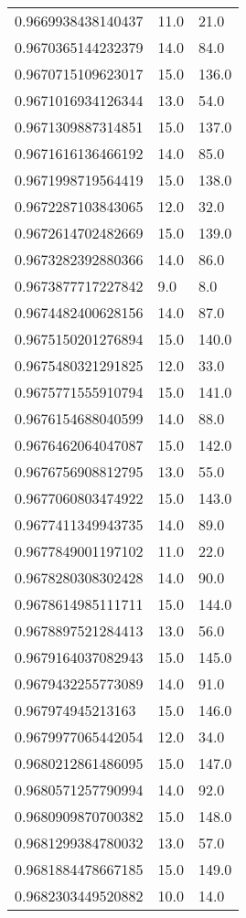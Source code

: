 \begin{center}
\begin{supertabular}[H]{p{0.30\textwidth}p{0.05\textwidth}p{0.05\textwidth}}
0.9669938438140437 & 11.0 & 21.0 \\ 
0.9670365144232379 & 14.0 & 84.0 \\ 
0.9670715109623017 & 15.0 & 136.0 \\ 
0.9671016934126344 & 13.0 & 54.0 \\ 
0.9671309887314851 & 15.0 & 137.0 \\ 
0.9671616136466192 & 14.0 & 85.0 \\ 
0.9671998719564419 & 15.0 & 138.0 \\ 
0.9672287103843065 & 12.0 & 32.0 \\ 
0.9672614702482669 & 15.0 & 139.0 \\ 
0.9673282392880366 & 14.0 & 86.0 \\ 
0.9673877717227842 & 9.0 & 8.0 \\ 
0.9674482400628156 & 14.0 & 87.0 \\ 
0.9675150201276894 & 15.0 & 140.0 \\ 
0.9675480321291825 & 12.0 & 33.0 \\ 
0.9675771555910794 & 15.0 & 141.0 \\ 
0.9676154688040599 & 14.0 & 88.0 \\ 
0.9676462064047087 & 15.0 & 142.0 \\ 
0.9676756908812795 & 13.0 & 55.0 \\ 
0.9677060803474922 & 15.0 & 143.0 \\ 
0.9677411349943735 & 14.0 & 89.0 \\ 
0.9677849001197102 & 11.0 & 22.0 \\ 
0.9678280308302428 & 14.0 & 90.0 \\ 
0.9678614985111711 & 15.0 & 144.0 \\ 
0.9678897521284413 & 13.0 & 56.0 \\ 
0.9679164037082943 & 15.0 & 145.0 \\ 
0.9679432255773089 & 14.0 & 91.0 \\ 
0.967974945213163 & 15.0 & 146.0 \\ 
0.9679977065442054 & 12.0 & 34.0 \\ 
0.9680212861486095 & 15.0 & 147.0 \\ 
0.9680571257790994 & 14.0 & 92.0 \\ 
0.9680909870700382 & 15.0 & 148.0 \\ 
0.9681299384780032 & 13.0 & 57.0 \\ 
0.9681884478667185 & 15.0 & 149.0 \\ 
0.9682303449520882 & 10.0 & 14.0 \\ 

\end{supertabular}
\end{center}
